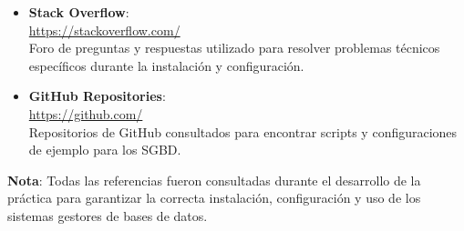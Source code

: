 \documentclass{article}
\begin{document}
\begin{itemize}
    \item \textbf{Stack Overflow}: \\
    \url{https://stackoverflow.com/} \\
    Foro de preguntas y respuestas utilizado para resolver problemas técnicos específicos durante la instalación y configuración.

    \item \textbf{GitHub Repositories}: \\
    \url{https://github.com/} \\
    Repositorios de GitHub consultados para encontrar scripts y configuraciones de ejemplo para los SGBD.
\end{itemize}

\textbf{Nota}: Todas las referencias fueron consultadas durante el desarrollo de la práctica para garantizar la correcta instalación, configuración y uso de los sistemas gestores de bases de datos.
\end{document}
